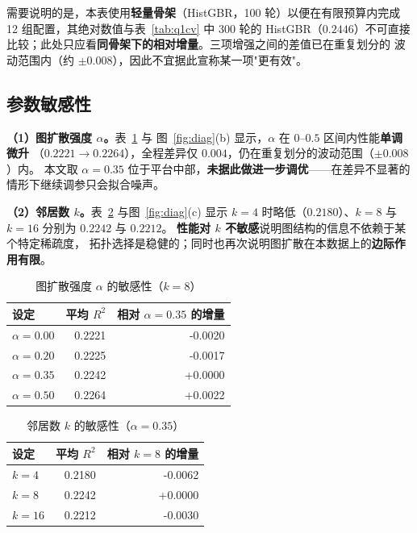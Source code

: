 需要说明的是，本表使用\textbf{轻量骨架}（HistGBR，100 轮）以便在有限预算内完成
12 组配置，其绝对数值与表~\ref{tab:q1cv} 中 300 轮的 HistGBR（$0.2446$）不可直接
比较；此处只应看\textbf{同骨架下的相对增量}。三项增强之间的差值已在重复划分的
波动范围内（约 $\pm0.008$），因此不宜据此宣称某一项"更有效"。

\subsection{参数敏感性}

\textbf{（1）图扩散强度 $\alpha$。}表~\ref{tab:sens_alpha} 与
图~\ref{fig:diag}(b) 显示，$\alpha$ 在 $0$--$0.5$ 区间内性能\textbf{单调微升}
（$0.2221\to0.2264$），全程差异仅 $0.004$，仍在重复划分的波动范围（$\pm0.008$）内。
本文取 $\alpha=0.35$ 位于平台中部，\textbf{未据此做进一步调优}——在差异不显著的
情形下继续调参只会拟合噪声。

\textbf{（2）邻居数 $k$。}表~\ref{tab:sens_topk} 与图~\ref{fig:diag}(c) 显示
$k=4$ 时略低（$0.2180$）、$k=8$ 与 $k=16$ 分别为 $0.2242$ 与 $0.2212$。
\textbf{性能对 $k$ 不敏感}说明图结构的信息不依赖于某个特定稀疏度，
拓扑选择是稳健的；同时也再次说明图扩散在本数据上的\textbf{边际作用有限}。

\begin{table}[H]
\centering
\caption{图扩散强度 $\alpha$ 的敏感性（$k=8$）}
\label{tab:sens_alpha}
\small
\begin{fittable}
\begin{tabular}{@{}lrr@{}}
\toprule
设定 & 平均 $R^2$ & 相对 $\alpha=0.35$ 的增量 \\
\midrule
$\alpha=0.00$ & 0.2221 & -0.0020 \\
$\alpha=0.20$ & 0.2225 & -0.0017 \\
$\alpha=0.35$ & 0.2242 & +0.0000 \\
$\alpha=0.50$ & 0.2264 & +0.0022 \\
\bottomrule
\end{tabular}
\end{fittable}
\end{table}

\begin{table}[H]
\centering
\caption{邻居数 $k$ 的敏感性（$\alpha=0.35$）}
\label{tab:sens_topk}
\small
\begin{fittable}
\begin{tabular}{@{}lrr@{}}
\toprule
设定 & 平均 $R^2$ & 相对 $k=8$ 的增量 \\
\midrule
$k=4$ & 0.2180 & -0.0062 \\
$k=8$ & 0.2242 & +0.0000 \\
$k=16$ & 0.2212 & -0.0030 \\
\bottomrule
\end{tabular}
\end{fittable}
\end{table}

